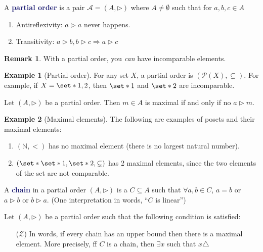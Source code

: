\documentclass[11pt]{article}
\numberwithin{equation}{section}
\newcommand{\navy}[1]{\textcolor{MidnightBlue}{\bf #1}}
\newcounter{theo}[section]\setcounter{theo}{0}
\theoremstyle{definition}
\theoremstyle{definition}
\newtheorem{example}{\color{WildStrawberry}Example}[section]
\newtheorem*{remark}{Remark}
\def\Set{\set*}%
\def\imp{\Rightarrow}
\newcommand{\1}{\mathbbm 1}
\newcommand{\NN}{\mathbb N}
\newcommand{\pP}{\mathcal P}
\newcommand{\aAA}{\mathcal A}
\newcommand{\zZ}{\mathcal Z}
\begin{document}
\begin{definition}
	A \navy{partial order} is a pair $\aAA = (A, \triangleright)$ where $A \neq \emptyset$ such that  for $a,b,c \in A$
	\begin{enumerate}
		\item Antireflexivity: $a \triangleright a$ never happens.
		\item Transitivity: $a \triangleright b, b \triangleright c \imp a \triangleright c$ 
	\end{enumerate}
\end{definition}
\begin{remark}
	With a partial order, you \emph{can} have incomparable elements. 
\end{remark}

\begin{example}[Partial order]
	For any set $X$, a partial order is $(\pP(X), \subsetneq)$. For example, if $X=\Set{1,2}$, then $\Set{1}$ and $\Set{2}$ are incomparable. 
\end{example}

\begin{definition}[Maximal]
	Let $(A, \triangleright)$ be a partial order. Then $m \in A$ is maximal if and only if no $a \triangleright m$. 
\end{definition}

\begin{example}[Maximal elements]
	The following are examples of posets and their maximal elements: 
	\begin{enumerate}
		\item $(\NN, <)$ has no maximal element (there is no largest natural number).
		\item $(\Set{\Set{1},\Set{2}}, \subsetneq)$ has 2 maximal elements, since the two elements of the set are not comparable. 
	\end{enumerate}
\end{example}

\begin{definition}[Chain]
	A \navy{chain} in a partial order $(A, \triangleright)$ is a $C \subseteq A$ such that $\forall a,b \in C$, $a=b$ or $a \triangleright b$ or $b \triangleright a$. (One interpretation in words, ``$C$ is linear'') 
\end{definition}

\begin{theorem}
	Let $(A, \triangleright)$ be a partial order such that the following condition is satisfied:
	\begin{itemize}
		\item[($\zZ$)] In words, if every chain has an upper bound then there is a maximal element. More precisely, ff $C$ is a chain, then $\exists x$ such that $x \triangle$
	\end{itemize}
\end{theorem}
\end{document}
